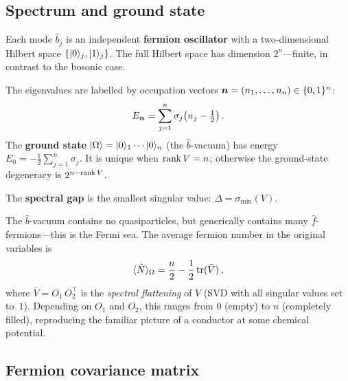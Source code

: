 \subsection{Spectrum and ground state}\label{sec:fermion-spectrum}

Each mode $\hat{b}_j$ is an independent \textbf{fermion oscillator}
with a two-dimensional Hilbert space
$\{\lvert 0 \rangle_j, \lvert 1 \rangle_j\}$.  The full Hilbert space has dimension
$2^n$---finite, in contrast to the bosonic case.

\begin{keyresult}
  The eigenvalues are labelled by occupation vectors
  $\boldsymbol{n} = (n_1, \ldots, n_n) \in \{0,1\}^n$:
  \begin{equation}\label{eq:fermion-eigenvalues}
    E_{\boldsymbol{n}}
    = \sum_{j=1}^{n} \sigma_j\bigl(n_j - \tfrac{1}{2}\bigr)\,.
  \end{equation}
  The \textbf{ground state} $\lvert \Omega \rangle = \lvert 0 \rangle_1 \cdots \lvert 0 \rangle_n$
  (the $\hat{b}$-vacuum) has energy
  $E_0 = -\frac{1}{2}\sum_{j=1}^{n} \sigma_j$.
  It is unique when $\operatorname{rank} V = n$; otherwise the ground-state
  degeneracy is $2^{n - \operatorname{rank} V}$.
\end{keyresult}

The \textbf{spectral gap} is the smallest singular value:
$\Delta = \sigma_{\min}(V)$.

\begin{intuition}
  The $\hat{b}$-vacuum contains no quasiparticles, but generically
  contains many $\hat{f}$-fermions---this is the Fermi sea.  The
  average fermion number in the original variables is
  \begin{equation}\label{eq:fermion-number}
    \langle \hat{N} \rangle_\Omega
    = \frac{n}{2} - \frac{1}{2}\operatorname{tr}(\bar{V})\,,
  \end{equation}
  where $\bar{V} = O_1\, O_2^\top$ is the \emph{spectral flattening}
  of $V$ (SVD with all singular values set to~$1$).  Depending on
  $O_1$ and $O_2$, this ranges from $0$ (empty) to $n$ (completely
  filled), reproducing the familiar picture of a conductor at some
  chemical potential.
\end{intuition}

\subsection{Fermion covariance matrix}\label{sec:fermion-covariance}

